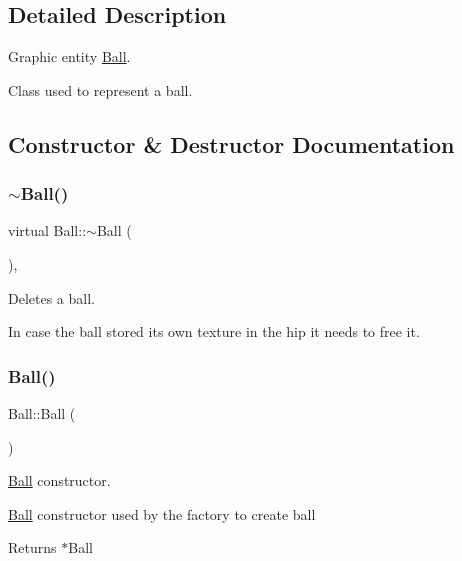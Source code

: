 \subsection{Detailed Description}
Graphic entity \hyperlink{class_ball}{Ball}. 

Class used to represent a ball. 

\subsection{Constructor \& Destructor Documentation}
\mbox{\label{class_ball_a78aa1f06b39fc9f81df82bef399c475c}} 
\subsubsection{\texorpdfstring{$\sim$\+Ball()}{~Ball()}}
{\footnotesize\ttfamily virtual Ball\+::$\sim$\+Ball (\begin{DoxyParamCaption}{ }\end{DoxyParamCaption})\hspace{0.3cm}{\ttfamily [inline]}, {\ttfamily [virtual]}}



Deletes a ball. 

In case the ball stored it\textquotesingle{}s own texture in the hip it needs to free it. \mbox{\label{class_ball_a86a144d3dad6c953e422e32435923bbb}} 
\subsubsection{\texorpdfstring{Ball()}{Ball()}\hspace{0.1cm}{\footnotesize\ttfamily [1/2]}}
{\footnotesize\ttfamily Ball\+::\+Ball (\begin{DoxyParamCaption}{ }\end{DoxyParamCaption})\hspace{0.3cm}{\ttfamily [protected]}}



\hyperlink{class_ball}{Ball} constructor. 

\hyperlink{class_ball}{Ball} constructor used by the factory to create ball

\begin{DoxyReturn}{Returns}
$\ast$\+Ball 
\end{DoxyReturn}
\mbox{\label{class_ball_a6587e385ce0f6bfd3772368159e54271}} 
